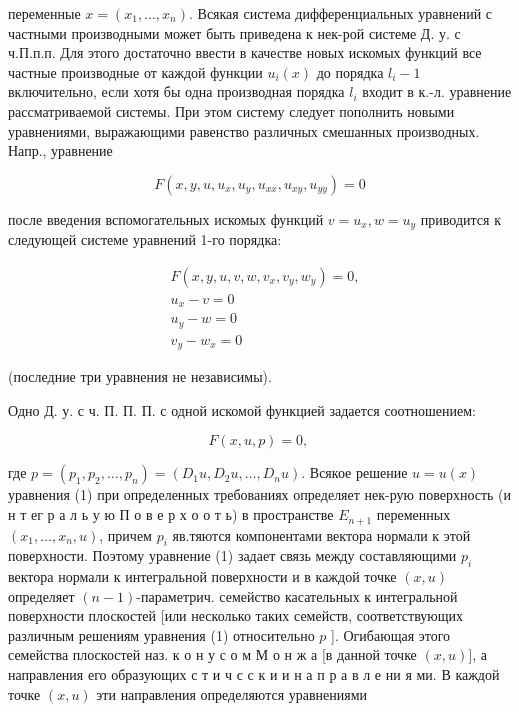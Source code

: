 \documentclass[10pt]{article}
\begin{document}
переменные $x=\left(x_{1}, \ldots, x_{n}\right)$. Всякая система дифференциальных уравнений с частными производными может быть приведена к нек-рой системе Д. у. с ч.П.п.п. Для этого достаточно ввести в качестве новых искомых функций все частные производные от каждой функции $u_{i}(x)$ до порядка $l_{i}-1$ включительно, если хотя бы одна производная порядка $l_{i}$ входит в к.-л. уравнение рассматриваемой системы. При этом систему следует пополнить новыми уравнениями, выражающими равенство различных смешанных производных. Напр., уравнение



\[

F\left(x, y, u, u_{x}, u_{y}, u_{x x}, u_{x y}, u_{y y}\right)=0

\]



после введения вспомогательных искомых функций $v=u_{x}, w=u_{y}$ приводится к следующей системе уравнений 1-го порядка:



\[

\begin{aligned}

& F\left(x, y, u, v, w, v_{x}, v_{y}, w_{y}\right)=0, \\

& u_{x}-v=0 \\

& u_{y}-w=0 \\

& v_{y}-w_{x}=0

\end{aligned}

\]



(последние три уравнения не независимы).



Одно Д. у. с ч. П. П. П. с одной искомой функцией задается соотношением:



\[

F(x, u, p)=0 \text {, }

\]



где $p=\left(p_{1}, p_{2}, \ldots, p_{n}\right)=\left(D_{1} u, D_{2} u, \ldots, D_{n} u\right)$. Всякое решение $u=u(x)$ уравнения (1) при определенных требованиях определяет нек-рую поверхность (и н т ег р а л ь у ю П о в е р х о о т ь) в пространстве $E_{n+1}$ переменных $\left(x_{1}, \ldots, x_{n}, u\right)$, причем $p_{i}$ яв.тяются компонентами вектора нормали к этой поверхности. Поэтому уравнение (1) задает связь между составляющими $p_{i}$ вектора нормали к интегральной поверхности и в каждой точке $(x, u)$ определяет $(n-1)$-параметрич. семейство касательных к интегральной поверхности плоскостей [или несколько таких семейств, соответствующих различным решениям уравнения (1) относительно $p$ ]. Огибающая этого семейства плоскостей наз. к о н у с о м М о н ж а [в данной точке $(x, u)]$, а направления его образующих с т и ч с с к и и н а п р а в л е ни я ми. В каждой точке $(x, u)$ эти направления определяются уравнениями
\end{document}
